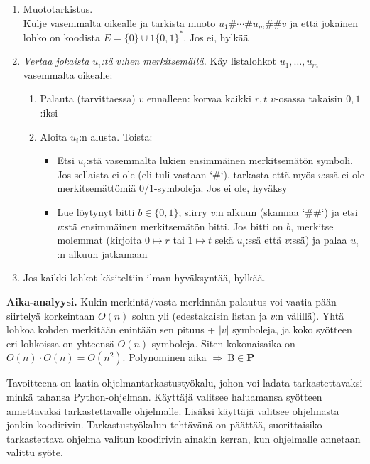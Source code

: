 \documentclass[12pt,a4paper]{article}
\begin{document}
\begin{alakohta}
\begin{enumerate}
  \item Muototarkistus.\\
   Kulje vasemmalta oikealle ja tarkista muoto
        $u_1\#\cdots\#u_m\#\#v$ ja että jokainen lohko on koodista
        $E=\{0\}\cup 1\{0,1\}^*$. Jos ei, hylkää
  \item \emph{Vertaa jokaista $u_i$:tä $v$:hen merkitsemällä.}
        Käy listalohkot $u_1,\ldots,u_m$ vasemmalta oikealle:
        \begin{enumerate}
          \item Palauta (tarvittaessa) $v$ ennalleen: korvaa kaikki
                $r, t$ $v$-osassa takaisin $0,1$:iksi
          \item Aloita $u_i$:n alusta. Toista:
                \begin{itemize}
                  \item Etsi $u_i$:stä vasemmalta lukien ensimmäinen merkitsemätön
                        symboli. Jos sellaista ei ole (eli tuli vastaan `\#`), tarkasta että
                        myös $v$:ssä ei ole merkitsemättömiä $0/1$-symboleja.
                        Jos ei ole, hyväksy
                  \item Lue löytynyt bitti $b\in\{0,1\}$; siirry $v$:n alkuun (skannaa `\#\#`)
                        ja etsi $v$:stä ensimmäinen merkitsemätön bitti.
                        Jos bitti on $b$, merkitse molemmat (kirjoita
                        $0\mapsto r$ tai $1\mapsto t$  sekä $u_i$:ssä että $v$:ssä) ja palaa
                        $u_i$:n alkuun jatkamaan
                \end{itemize}
        \end{enumerate}
  \item Jos kaikki lohkot käsiteltiin ilman hyväksyntää, hylkää.
\end{enumerate}

\textbf{Aika-analyysi.}
Kukin merkintä/vasta-merkinnän palautus voi vaatia pään siirtelyä
korkeintaan $O(n)$ solun yli (edestakaisin listan ja $v$:n välillä).
Yhtä lohkoa kohden merkitään enintään sen pituus + $|v|$ symboleja,
ja koko syötteen eri lohkoissa on yhteensä $O(n)$ symboleja.
Siten kokonaisaika on $O(n)\cdot O(n)=O(n^2)$.
Polynominen aika $\Rightarrow\ \mathrm{B}\in\mathbf{P}$

\end{alakohta}





\pagebreak
{}
Tavoitteena on laatia ohjelmantarkastustyökalu, johon voi ladata
tarkastettavaksi minkä tahansa Python-ohjelman.
Käyttäjä valitsee haluamansa syötteen annettavaksi
tarkastettavalle ohjelmalle.
Lisäksi käyttäjä valitsee ohjelmasta jonkin koodirivin.
Tarkastustyökalun tehtävänä on päättää,
suorittaisiko tarkastettava ohjelma
valitun koodirivin ainakin kerran, kun ohjelmalle annetaan
valittu syöte.\\
\end{document}
